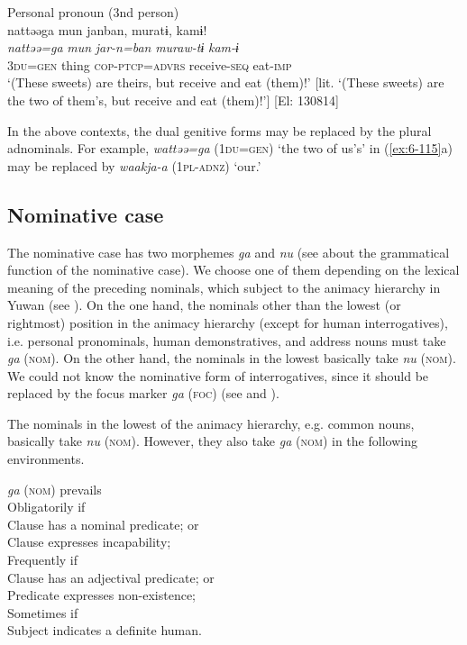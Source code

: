 \ex Personal pronoun (3nd person)\\
{\TM}
\glll  nattəəga  mun  janban,  muratɨ,  kamɨ!\\
\textit{nattəə=ga}  \textit{mun}  \textit{jar-n=ban}  \textit{muraw-tɨ}  \textit{kam-ɨ}\\
3\textsc{du}=\textsc{gen}  thing  \textsc{cop}-\textsc{ptcp}=\textsc{advrs}  receive-\textsc{seq}  eat-\textsc{imp}\\
\glt ‘(These sweets) are theirs, but receive and eat (them)!’ [lit. ‘(These sweets) are the two of them’s, but receive and eat (them)!’]      [El: 130814]
\z
\z

In the above contexts, the dual genitive forms may be replaced by the plural adnominals. For example, \textit{wattəə=ga} (1\textsc{du}=\textsc{gen}) ‘the two of us’s’ in (\ref{ex:6-115}a) may be replaced by \textit{waakja-a} (1\textsc{pl}-\textsc{adnz}) ‘our.’

\subsection{Nominative case}

The nominative case has two morphemes \textit{ga} and \textit{nu} (see  about the grammatical function of the nominative case). We choose one of them depending on the lexical meaning of the preceding nominals, which subject to the animacy hierarchy in Yuwan (see ). On the one hand, the nominals other than the lowest (or rightmost) position in the animacy hierarchy (except for human interrogatives), i.e. personal pronominals, human demonstratives, and address nouns must take \textit{ga} (\textsc{nom}). On the other hand, the nominals in the lowest basically take \textit{nu} (\textsc{nom}). We could not know the nominative form of interrogatives, since it should be replaced by the focus marker \textit{ga} (\textsc{foc}) (see  and ).

The nominals in the lowest of the animacy hierarchy, e.g. common nouns, basically take \textit{nu} (\textsc{nom}). However, they also take \textit{ga} (\textsc{nom}) in the following environments.

\ea\label{ex:6-116}
 \textit{ga} (\textsc{nom}) prevails\\
  Obligatorily if\\

 \ea Clause has a nominal predicate; or\\
\ex Clause expresses incapability;\\
  Frequently if\\
\ex Clause has an adjectival predicate; or\\
\ex Predicate expresses non-existence;\\
  Sometimes if\\
\ex Subject indicates a definite human.\\
\z
\z

